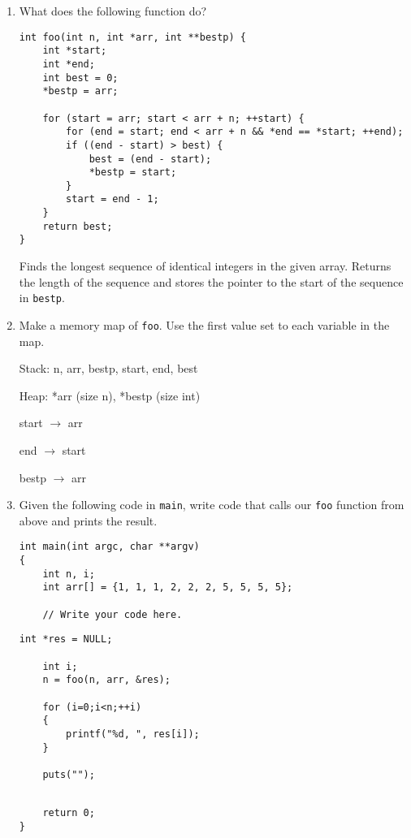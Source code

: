 %
%


\begin{enumerate}
\item What does the following function do?

\begin{lstlisting}
int foo(int n, int *arr, int **bestp) {
	int *start;
	int *end;
	int best = 0;
	*bestp = arr;
	
	for (start = arr; start < arr + n; ++start)	{
		for (end = start; end < arr + n && *end == *start; ++end);
		if ((end - start) > best) {
			best = (end - start);
			*bestp = start;
		}
		start = end - 1;
	}
	return best;
}
\end{lstlisting}

\begin{answer}
Finds the longest sequence of identical integers in the given array.
Returns the length of the sequence and stores the pointer to the start of the sequence in \texttt{bestp}.
\end{answer}

\item Make a memory map of \texttt{foo}. Use the first value set to each variable in the map.

\begin{answer}
Stack: n, arr, bestp, start, end, best

Heap: *arr (size n), *bestp (size int)

start $\rightarrow$ arr

end $\rightarrow$ start

bestp $\rightarrow$ arr
\end{answer}

\vspace{20px}

\item Given the following code in \texttt{main}, write code that calls our \texttt{foo} function from above
and prints the result.
\begin{lstlisting}[numbers=none]
int main(int argc, char **argv)
{
	int n, i;
	int arr[] = {1, 1, 1, 2, 2, 2, 5, 5, 5, 5};

	// Write your code here.
\end{lstlisting}

\begin{answer}
\begin{lstlisting}[numbers=none]
	int *res = NULL;

	int i;
	n = foo(n, arr, &res);

	for (i=0;i<n;++i)
	{
		printf("%d, ", res[i]);
	}
	
	puts("");
\end{lstlisting}
\end{answer}

\begin{lstlisting}[numbers=none]

	return 0;
}
\end{lstlisting}

\end{enumerate}
